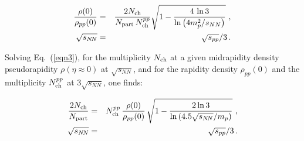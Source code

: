 \documentclass[twocolumn,showpacs,preprintnumbers,prd,superscriptaddress,nofootinbib]{revtex4}
\begin{document}
\begin{eqnarray}
\nonumber
\frac{\rho(0)}{\rho_{pp}(0)}&=&
\frac{2N_{\rm ch}}{N_{\rm part}\, N_{\rm ch}^{pp}} 
\sqrt{1 -
\frac{4\, \ln 3}{\ln \left( 4m_p^2/s_{NN}\right) }} \ ,  \\ 
\sqrt{s_{N\!N}}&=&\sqrt{s_{pp}}/3 \, .
\label{eqn3}
\end{eqnarray}
\nopar

Solving Eq.~(\ref{eqn3}), for the multiplicity $N_{\rm{ch}}$ at a given midrapidity density  pseudorapidity $\rho(\eta\! \approx\! 0)$ at $\sqrt{s_{NN}}$, and for the rapidity density  $\rho_{pp}(0)$ and the multiplicity $N_{\rm{ch}}^{pp}$ at $3 \sqrt{s_{NN}}$, one finds:

\begin{eqnarray}
\nonumber
\frac{2N_{\rm{ch}}}{N_{\rm{part}}}  &=&
N^{pp}_{\rm ch} \,
\frac{\rho(0)}{\rho_{pp}(0)} \,
\sqrt{1-\frac{2 \ln 3}{\ln\, (4.5 \sqrt{s_{N\!N}}/m_ p)}}\ ,  \\
	    \sqrt{s_{N\!N}}&=&\sqrt{s_{pp}}/3 \, .
\label{eqn4}
\end{eqnarray}
\nopar
\end{document}
